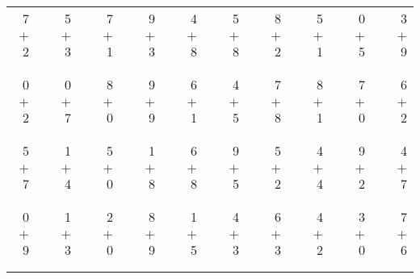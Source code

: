 \documentclass[12pt, letterpaper]{article}
\begin{document}
\begin{tabular}{rrrrrrrrrrrrrrrrrrr}
7 & & 5 & & 7 & & 9 & & 4 & & 5 & & 8 & & 5 & & 0 & & 3\\
$+$ 2 & & $+$ 3 & & $+$ 1 & & $+$ 3 & & $+$ 8 & & $+$ 8 & & $+$ 2 & & $+$ 1 & & $+$ 5 & & $+$ 9\\
\cline{1-1} \cline{3-3} \cline{5-5} \cline{7-7} \cline{9-9} \cline{11-11} \cline{13-13} \cline{15-15} \cline{17-17} \cline{19-19} \\ \\
0 & & 0 & & 8 & & 9 & & 6 & & 4 & & 7 & & 8 & & 7 & & 6\\
$+$ 2 & & $+$ 7 & & $+$ 0 & & $+$ 9 & & $+$ 1 & & $+$ 5 & & $+$ 8 & & $+$ 1 & & $+$ 0 & & $+$ 2\\
\cline{1-1} \cline{3-3} \cline{5-5} \cline{7-7} \cline{9-9} \cline{11-11} \cline{13-13} \cline{15-15} \cline{17-17} \cline{19-19} \\ \\
5 & & 1 & & 5 & & 1 & & 6 & & 9 & & 5 & & 4 & & 9 & & 4\\
$+$ 7 & & $+$ 4 & & $+$ 0 & & $+$ 8 & & $+$ 8 & & $+$ 5 & & $+$ 2 & & $+$ 4 & & $+$ 2 & & $+$ 7\\
\cline{1-1} \cline{3-3} \cline{5-5} \cline{7-7} \cline{9-9} \cline{11-11} \cline{13-13} \cline{15-15} \cline{17-17} \cline{19-19} \\ \\
0 & & 1 & & 2 & & 8 & & 1 & & 4 & & 6 & & 4 & & 3 & & 7\\
$+$ 9 & & $+$ 3 & & $+$ 0 & & $+$ 9 & & $+$ 5 & & $+$ 3 & & $+$ 3 & & $+$ 2 & & $+$ 0 & & $+$ 6\\
\cline{1-1} \cline{3-3} \cline{5-5} \cline{7-7} \cline{9-9} \cline{11-11} \cline{13-13} \cline{15-15} \cline{17-17} \cline{19-19} \\ \\
\end{tabular}
\newpage
\end{document}
